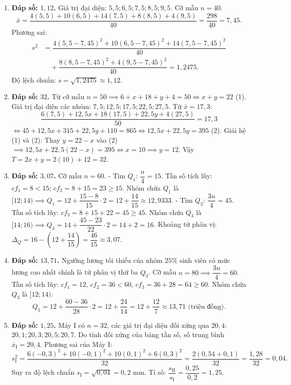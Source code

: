 \documentclass[12pt,a4paper]{article}
\begin{document}
\begin{enumerate}
\item \textbf{Đáp số: $1{,}12$.}  
Giá trị đại diện: $5{,}5; 6{,}5; 7{,}5; 8{,}5; 9{,}5$. Cỡ mẫu $n = 40$.  
\[
\bar{x} = \dfrac{4(5{,}5) + 10(6{,}5) + 14(7{,}5) + 8(8{,}5) + 4(9{,}5)}{40} = \dfrac{298}{40} = 7{,}45.
\]
Phương sai:  
\begin{align*}
s^2 &= \dfrac{4(5{,}5 - 7{,}45)^2 + 10(6{,}5 - 7{,}45)^2 + 14(7{,}5 - 7{,}45)^2}{40} \\
    &\quad + \dfrac{8(8{,}5 - 7{,}45)^2 + 4(9{,}5 - 7{,}45)^2}{40} = 1{,}2475.
\end{align*}
Độ lệch chuẩn: $s = \sqrt{1{,}2475} \approx 1{,}12$.

\item \textbf{Đáp số: $32$.}  
Từ cỡ mẫu $n = 50 \implies 6 + x + 18 + y + 4 = 50 \iff x + y = 22$ (1).  
Giá trị đại diện các nhóm: $7{,}5; 12{,}5; 17{,}5; 22{,}5; 27{,}5$.  
Từ $\bar{x} = 17{,}3$:  
\[
\dfrac{6(7{,}5) + 12{,}5x + 18(17{,}5) + 22{,}5y + 4(27{,}5)}{50} = 17{,}3
\]
$\iff 45 + 12{,}5x + 315 + 22{,}5y + 110 = 865 \iff 12{,}5x + 22{,}5y = 395$ (2).  
Giải hệ (1) và (2): Thay $y = 22 - x$ vào (2) $\implies 12{,}5x + 22{,}5(22 - x) = 395 \iff x = 10 \implies y = 12$.  
Vậy $T = 2x + y = 2(10) + 12 = 32$.

\item \textbf{Đáp số: $3{,}07$.}  
Cỡ mẫu $n = 60$.  
- Tìm $Q_1$: $\dfrac{n}{4} = 15$. Tần số tích lũy: $cf_1 = 8 < 15$; $cf_2 = 8 + 15 = 23 \ge 15$.  
Nhóm chứa $Q_1$ là $[12; 14) \implies Q_1 = 12 + \dfrac{15 - 8}{15} \cdot 2 = 12 + \dfrac{14}{15} \approx 12{,}9333$.  
- Tìm $Q_3$: $\dfrac{3n}{4} = 45$. Tần số tích lũy: $cf_3 = 8 + 15 + 22 = 45 \ge 45$.  
Nhóm chứa $Q_3$ là $[14; 16) \implies Q_3 = 14 + \dfrac{45 - 23}{22} \cdot 2 = 14 + 2 = 16$.  
Khoảng tứ phân vị: $\Delta_Q = 16 - \left(12 + \dfrac{14}{15}\right) = \dfrac{46}{15} \approx 3{,}07$.

\item \textbf{Đáp số: $13{,}71$.}  
Ngưỡng lương tối thiểu của nhóm $25\%$ sinh viên có mức lương cao nhất chính là tứ phân vị thứ ba $Q_3$.  
Cỡ mẫu $n = 80 \implies \dfrac{3n}{4} = 60$.  
Tần số tích lũy: $cf_1 = 12$, $cf_2 = 36 < 60$, $cf_3 = 36 + 28 = 64 \ge 60$.  
Nhóm chứa $Q_3$ là $[12; 14)$:  
\[
Q_3 = 12 + \dfrac{60 - 36}{28} \cdot 2 = 12 + \dfrac{24}{14} = 12 + \dfrac{12}{7} \approx 13{,}71\text{ (triệu đồng)}.
\]

\item \textbf{Đáp số: $1{,}25$.}  
Máy I có $n = 32$, các giá trị đại diện đối xứng qua $20{,}4$: $20{,}1; 20{,}3; 20{,}5; 20{,}7$.  
Do tính đối xứng của bảng tần số, số trung bình $\bar{x}_{\text{I}} = 20{,}4$.  
Phương sai của Máy I:  
\[
s_{\text{I}}^2 = \dfrac{6(-0{,}3)^2 + 10(-0{,}1)^2 + 10(0{,}1)^2 + 6(0{,}3)^2}{32} = \dfrac{2(0{,}54 + 0{,}1)}{32} = \dfrac{1{,}28}{32} = 0{,}04.
\]
Suy ra độ lệch chuẩn $s_{\text{I}} = \sqrt{0{,}04} = 0{,}2\text{ mm}$.  
Tỉ số: $\dfrac{s_{\text{II}}}{s_{\text{I}}} = \dfrac{0{,}25}{0{,}2} = 1{,}25$.


\end{enumerate}
\end{document}
